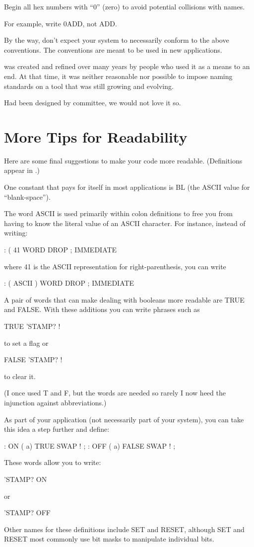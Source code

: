 \begin{tip}
Begin all hex numbers with ``0'' (zero) to avoid potential collisions with
names.
\end{tip}
For example, write 0ADD, not ADD.

By the way, don't expect your \Forth{} system to necessarily conform
to the above conventions.  The conventions are meant to be used in
new applications.

\Forth{} was created and refined over many years by people who
used it as a means to an end.  At that time, it was neither reasonable nor
possible to impose naming standards on a tool that was still growing and
evolving.

Had \Forth{} been designed by committee, we would not love it so.

\section{More Tips for Readability}

Here are some final suggestions to make your code more readable.
(Definitions appear in .)

One constant that pays for itself in most applications is
BL (the ASCII value for ``blank-space'').

The word ASCII is used primarily within colon definitions to free
you from having to know the literal value of an ASCII character.  For instance,
instead of writing:
\begin{Code}
: (    41 WORD  DROP ; IMMEDIATE
\end{Code}
where 41 is the ASCII representation for right-parenthesis, you can write
\begin{Code}
: (    ASCII ) WORD  DROP ; IMMEDIATE
\end{Code}
A pair of words that can make dealing with booleans more readable are
TRUE and FALSE.  With these additions you can write phrases such as

\begin{Code}
TRUE 'STAMP? !
\end{Code}
to set a flag or
\begin{Code}
FALSE 'STAMP? !
\end{Code}
to clear it.

(I once used T and F, but the words are needed so rarely I now heed
the injunction against abbreviations.)

As part of your application (not necessarily part of your \Forth{}
system), you can take this idea a step further and define:
\begin{Code}
: ON   ( a)  TRUE SWAP ! ;
: OFF   ( a)  FALSE SWAP ! ;
\end{Code}
These words allow you to write:
\begin{Code}
'STAMP? ON
\end{Code}
or
\begin{Code}
'STAMP? OFF
\end{Code}
Other names for these definitions include SET and RESET, although
SET and RESET most commonly use bit masks to manipulate individual
bits.

